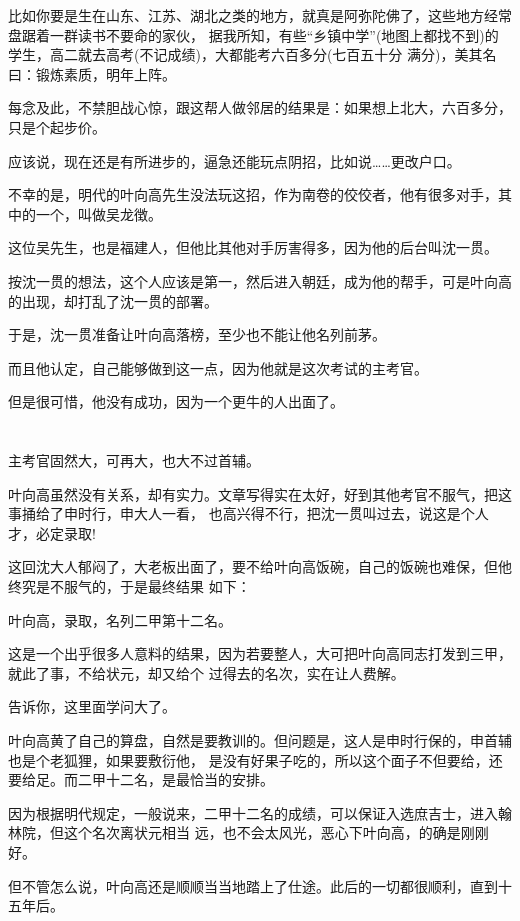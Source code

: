 \documentclass[11pt,a4paper,onecolumn]{article}
\begin{document}
比如你要是生在山东、江苏、湖北之类的地方，就真是阿弥陀佛了，这些地方经常盘踞着一群读书不要命的家伙，
据我所知，有些``乡镇中学''(地图上都找不到)的学生，高二就去高考(不记成绩)，大都能考六百多分(七百五十分
满分)，美其名曰：锻炼素质，明年上阵。

每念及此，不禁胆战心惊，跟这帮人做邻居的结果是：如果想上北大，六百多分，只是个起步价。

应该说，现在还是有所进步的，逼急还能玩点阴招，比如说……更改户口。

不幸的是，明代的叶向高先生没法玩这招，作为南卷的佼佼者，他有很多对手，其中的一个，叫做吴龙徴。

这位吴先生，也是福建人，但他比其他对手厉害得多，因为他的后台叫沈一贯。

按沈一贯的想法，这个人应该是第一，然后进入朝廷，成为他的帮手，可是叶向高的出现，却打乱了沈一贯的部署。

于是，沈一贯准备让叶向高落榜，至少也不能让他名列前茅。

而且他认定，自己能够做到这一点，因为他就是这次考试的主考官。

但是很可惜，他没有成功，因为一个更牛的人出面了。

\section[\thesection]{}

主考官固然大，可再大，也大不过首辅。

叶向高虽然没有关系，却有实力。文章写得实在太好，好到其他考官不服气，把这事捅给了申时行，申大人一看，
也高兴得不行，把沈一贯叫过去，说这是个人才，必定录取!

这回沈大人郁闷了，大老板出面了，要不给叶向高饭碗，自己的饭碗也难保，但他终究是不服气的，于是最终结果
如下：

叶向高，录取，名列二甲第十二名。

这是一个出乎很多人意料的结果，因为若要整人，大可把叶向高同志打发到三甲，就此了事，不给状元，却又给个
过得去的名次，实在让人费解。

告诉你，这里面学问大了。

叶向高黄了自己的算盘，自然是要教训的。但问题是，这人是申时行保的，申首辅也是个老狐狸，如果要敷衍他，
是没有好果子吃的，所以这个面子不但要给，还要给足。而二甲十二名，是最恰当的安排。

因为根据明代规定，一般说来，二甲十二名的成绩，可以保证入选庶吉士，进入翰林院，但这个名次离状元相当
远，也不会太风光，恶心下叶向高，的确是刚刚好。

但不管怎么说，叶向高还是顺顺当当地踏上了仕途。此后的一切都很顺利，直到十五年后。
\end{document}

